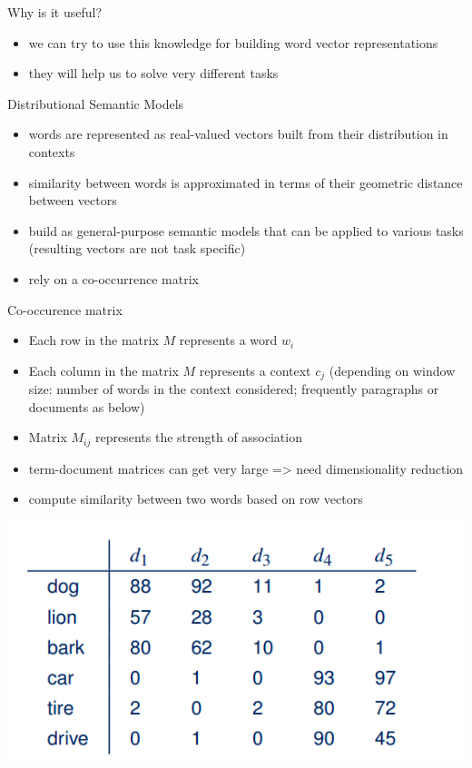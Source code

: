 \documentclass[svgnames]{beamer}
\begin{document}
    \begin{frame}{Why is it useful?}
        \begin{itemize}
            \item we can try to use this knowledge for building word vector representations
            \item they will help us to solve very different tasks
        \end{itemize}
    \end{frame}


    \begin{frame}{Distributional Semantic Models}
        \begin{itemize}
            \item words are represented as real-valued vectors built from their
            distribution in contexts
            \item similarity between words is approximated in terms of their
            geometric distance between vectors
            \item build as general-purpose semantic models that can be applied
            to various tasks (resulting vectors are not task specific)
            \item rely on a co-occurrence matrix
        \end{itemize}
    \end{frame}


    \begin{frame}{Co-occurence matrix}
        \begin{itemize}
            \item Each row in the matrix $M$ represents a word $w_i$
            \item Each column in the matrix $M$ represents a context $c_j$
            (depending on window size: number of words in the context
            considered; frequently paragraphs or documents as below)
            \item Matrix $M_{ij}$ represents the strength of association
            \item term-document matrices can get very large => need dimensionality
            reduction
            \item compute similarity between two words based on row vectors
        \end{itemize}
        \includegraphics[width=.6\textwidth]{co-occurence-docs.png}
    \end{frame}
\end{document}
